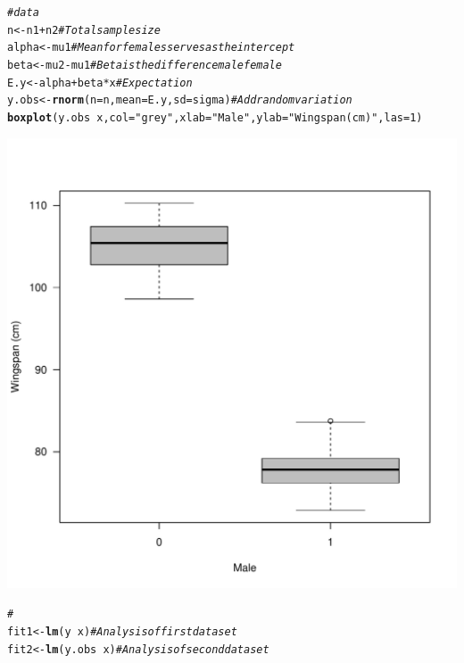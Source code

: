 \documentclass{article}\usepackage[]{graphicx}\usepackage[]{color}
\makeatletter
\def\maxwidth{ %
  \ifdim\Gin@nat@width>\linewidth
    \linewidth
  \else
    \Gin@nat@width
  \fi
}
\newcommand{\hlnum}[1]{\textcolor[rgb]{0.686,0.059,0.569}{#1}}%
\newcommand{\hlstr}[1]{\textcolor[rgb]{0.192,0.494,0.8}{#1}}%
\newcommand{\hlcom}[1]{\textcolor[rgb]{0.678,0.584,0.686}{\textit{#1}}}%
\newcommand{\hlopt}[1]{\textcolor[rgb]{0,0,0}{#1}}%
\newcommand{\hlstd}[1]{\textcolor[rgb]{0.345,0.345,0.345}{#1}}%
\newcommand{\hlkwb}[1]{\textcolor[rgb]{0.69,0.353,0.396}{#1}}%
\newcommand{\hlkwc}[1]{\textcolor[rgb]{0.333,0.667,0.333}{#1}}%
\newcommand{\hlkwd}[1]{\textcolor[rgb]{0.737,0.353,0.396}{\textbf{#1}}}%
\newenvironment{kframe}{%
 \def\at@end@of@kframe{}%
 \ifinner\ifhmode%
  \def\at@end@of@kframe{\end{minipage}}%
  \begin{minipage}{\columnwidth}%
 \fi\fi%
 \def\FrameCommand##1{\hskip\@totalleftmargin \hskip-\fboxsep
 \colorbox{shadecolor}{##1}\hskip-\fboxsep
     \hskip-\linewidth \hskip-\@totalleftmargin \hskip\columnwidth}%
 \MakeFramed {\advance\hsize-\width
   \@totalleftmargin\z@ \linewidth\hsize
   \@setminipage}}%
 {\par\unskip\endMakeFramed%
 \at@end@of@kframe}
\newenvironment{knitrout}{}{} %
\makeatother
\begin{document}
\begin{knitrout}
\begin{kframe}\begin{alltt}
\hlcom{# data}
\hlstd{n} \hlkwb{<-} \hlstd{n1} \hlopt{+} \hlstd{n2}  \hlcom{# Total sample size}
\hlstd{alpha} \hlkwb{<-} \hlstd{mu1}  \hlcom{# Mean for females serves as the intercept}
\hlstd{beta} \hlkwb{<-} \hlstd{mu2} \hlopt{-} \hlstd{mu1}  \hlcom{# Beta is the difference male female}
\hlstd{E.y} \hlkwb{<-} \hlstd{alpha} \hlopt{+} \hlstd{beta} \hlopt{*} \hlstd{x}  \hlcom{# Expectation}
\hlstd{y.obs} \hlkwb{<-} \hlkwd{rnorm}\hlstd{(}\hlkwc{n} \hlstd{= n,} \hlkwc{mean} \hlstd{= E.y,} \hlkwc{sd} \hlstd{= sigma)}  \hlcom{# Add random variation}
\hlkwd{boxplot}\hlstd{(y.obs} \hlopt{~} \hlstd{x,} \hlkwc{col} \hlstd{=} \hlstr{"grey"}\hlstd{,} \hlkwc{xlab} \hlstd{=} \hlstr{"Male"}\hlstd{,} \hlkwc{ylab} \hlstd{=} \hlstr{"Wingspan (cm)"}\hlstd{,} \hlkwc{las} \hlstd{=} \hlnum{1}\hlstd{)}
\end{alltt}
\end{kframe}
\includegraphics[width=\maxwidth]{figure/unnamed-chunk-122} 
\begin{kframe}\begin{alltt}
\hlcom{# }
\hlstd{fit1} \hlkwb{<-} \hlkwd{lm}\hlstd{(y} \hlopt{~} \hlstd{x)}  \hlcom{# Analysis of first data set}
\hlstd{fit2} \hlkwb{<-} \hlkwd{lm}\hlstd{(y.obs} \hlopt{~} \hlstd{x)}  \hlcom{# Analysis of second data set}

\end{alltt}
\end{kframe}
\end{knitrout}
\end{document}
